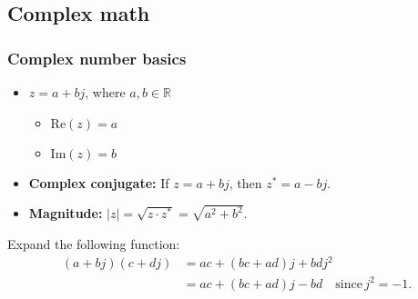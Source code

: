 \subsection{Complex math}
    \subsubsection{Complex number basics}
    \begin{definition}
    \begin{itemize}
        \item \( z = a + bj \), where \( a, b \in \mathbb{R} \)
        \begin{itemize}
            \item \( \text{Re}(z) = a \)
            \item \( \text{Im}(z) = b \)
        \end{itemize}
        
        \item \textbf{Complex conjugate:} If \( z = a + bj \), then \( z^* = a - bj \).
        
        \item \textbf{Magnitude:} \( |z| = \sqrt{z \cdot z^*} = \sqrt{a^2 + b^2} \).
    \end{itemize}

        \begin{center}
        \end{center}

    \end{definition}

    \begin{example} 
        Expand the following function:
        \begin{align*}
            (a + bj)(c + dj) &= ac + (bc + ad)j + bdj^2 \\
            &= ac + (bc + ad)j - bd \quad \text{since} \, j^2 = -1.
        \end{align*}
    \end{example}

